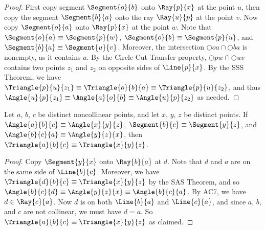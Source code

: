 \documentclass{article}
\begin{document}
\begin{proof}
First copy segment $\Segment{o}{b}$ onto $\Ray{p}{x}$ at the point $u$, then copy the segment $\Segment{b}{a}$ onto the ray $\Ray{u}{p}$ at the point $v$. Now copy $\Segment{o}{a}$ onto $\Ray{p}{x}$ at the point $w$. Note that $\Segment{o}{a} \equiv \Segment{p}{w}$, $\Segment{o}{b} \equiv \Segment{p}{u}$, and $\Segment{b}{a} \equiv \Segment{u}{v}$. Moreover, the intersection $\Circle{o}{a} \cap \Circle{b}{a}$ is nonempty, as it contains $a$. By the Circle Cut Transfer property, $\Circle{p}{w} \cap \Circle{u}{v}$ contains two points $z_1$ and $z_2$ on opposite sides of $\Line{p}{x}$. By the SSS Theorem, we have $\Triangle{p}{u}{z_1} \equiv \Triangle{o}{b}{a} \equiv \Triangle{p}{u}{z_2}$, and thus $\Angle{u}{p}{z_1} \equiv \Angle{a}{o}{b} \equiv \Angle{u}{p}{z_2}$ as needed.
\end{proof}

\begin{prop}
Let $a$, $b$, $c$ be distinct noncollinear points, and let $x$, $y$, $z$ be distinct points. If $\Angle{a}{b}{c} \equiv \Angle{x}{y}{z}$, $\Segment{b}{c} \equiv \Segment{y}{z}$, and $\Angle{b}{c}{a} \equiv \Angle{y}{z}{x}$, then $\Triangle{a}{b}{c} \equiv \Triangle{x}{y}{z}$.
\end{prop}

\begin{proof}
Copy $\Segment{y}{x}$ onto $\Ray{b}{a}$ at $d$. Note that $d$ and $a$ are on the same side of $\Line{b}{c}$. Moreover, we have $\Triangle{d}{b}{c} \equiv \Triangle{x}{y}{z}$ by the SAS Theorem, and so $\Angle{b}{c}{d} \equiv \Angle{y}{z}{x} \equiv \Angle{b}{c}{a}$. By AC7, we have $d \in \Ray{c}{a}$. Now $d$ is on both $\Line{b}{a}$ and $\Line{c}{a}$, and since $a$, $b$, and $c$ are not collinear, we must have $d = a$. So $\Triangle{a}{b}{c} \equiv \Triangle{x}{y}{z}$ as claimed.
\end{proof}
\end{document}
